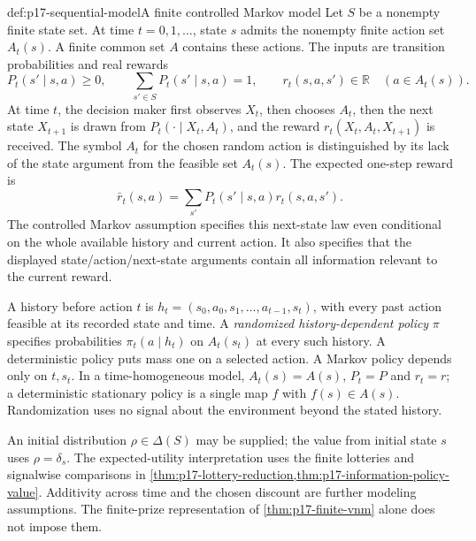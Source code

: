 \begin{hbdefinition}{def:p17-sequential-model}{A finite controlled Markov model}
Let \(S\) be a nonempty finite state set. At time
\(t=0,1,\ldots\), state \(s\) admits the nonempty finite action
set \(A_t(s)\). A finite common set \(A\) contains these actions.
The inputs are transition probabilities and real rewards
\[
 P_t(s'\mid s,a)\geq0,\qquad
 \sum_{s'\in S}P_t(s'\mid s,a)=1,\qquad
 r_t(s,a,s')\in\mathbb R
 \quad(a\in A_t(s)).
\]
At time \(t\), the decision maker first observes \(X_t\),
then chooses \(A_t\), then the next state \(X_{t+1}\) is
drawn from \(P_t(\cdot\mid X_t,A_t)\), and the reward
\(r_t(X_t,A_t,X_{t+1})\) is received.
The symbol \(A_t\) for the chosen random action is distinguished
by its lack of the state argument from the feasible set \(A_t(s)\).
The expected one-step reward is
\[
                 \bar r_t(s,a)=
                     \sum_{s'}P_t(s'\mid s,a)r_t(s,a,s').
\]
The controlled Markov assumption specifies this next-state law
even conditional on the whole available history and current action.
It also specifies that the displayed state/action/next-state
arguments contain all information relevant to the current reward.

A history before action \(t\) is
\(h_t=(s_0,a_0,s_1,\ldots,a_{t-1},s_t)\), with every past
action feasible at its recorded state and time. A
\emph{randomized history-dependent policy} \(\pi\) specifies
probabilities \(\pi_t(a\mid h_t)\) on \(A_t(s_t)\) at every
such history. A deterministic policy puts mass one on a selected
action. A Markov policy depends only on \(t,s_t\).
In a time-homogeneous model, \(A_t(s)=A(s)\),
\(P_t=P\) and \(r_t=r\); a deterministic stationary policy
is a single map \(f\) with \(f(s)\in A(s)\).
Randomization uses no signal about the environment beyond
the stated history.

An initial distribution \(\rho\in\Delta(S)\) may be supplied;
the value from initial state \(s\) uses \(\rho=\delta_s\).
The expected-utility interpretation uses the finite lotteries
and signalwise comparisons in
\cref{thm:p17-lottery-reduction,thm:p17-information-policy-value}.
Additivity across time and the chosen discount are further
modeling assumptions. The finite-prize representation
of \cref{thm:p17-finite-vnm} alone does not impose them.
\end{hbdefinition}

